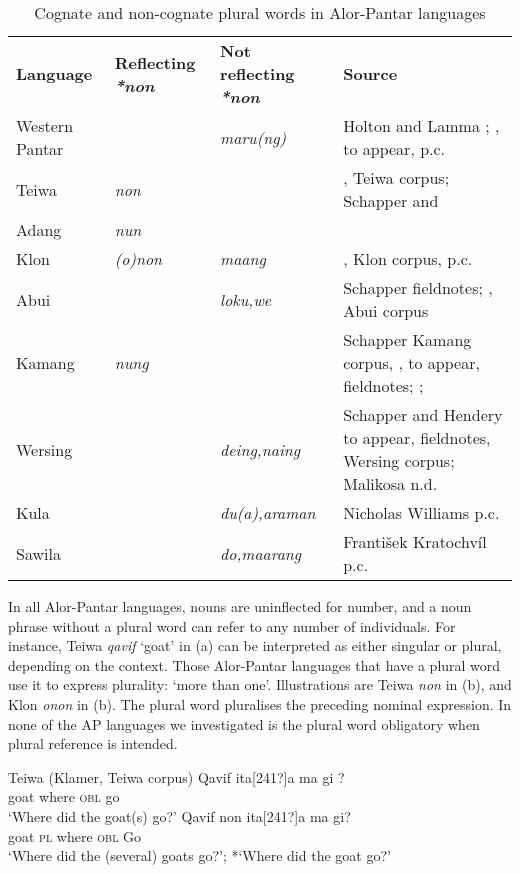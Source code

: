 \begin{table}\centering
\begin{tabular}{p{1.5cm}p{2cm}p{2.5cm}p{4cm}}
\textbf{Language}  &\textbf{Reflecting} \textbf{\textit{*non}} &\textbf{Not reflecting} \textbf{\textit{*non} } &\textbf{Source}\\
Western Pantar & &\textit{maru(ng)} &Holton and Lamma \citet{Koly2008}; \citet{Holton2012}, to appear, p.c.\\
Teiwa &\textit{non} & &\citet{Klamer2010}, Teiwa corpus; Schapper and \citet{Klamer2011}\\
Adang &\textit{nun} & &\citet{RobinsonEtAlToAppear}\\
Klon &\textit{(o)non} &\textit{maang} &\citet{Baird2008}, Klon corpus, p.c.\\
Abui & &\textit{loku,}\textit{we} &Schapper fieldnotes; \citet{Kratochvil2007}, Abui corpus\\
Kamang &\textit{nung} & &Schapper Kamang corpus, , to appear, fieldnotes;  \citet{SchapperEtAl2011};  \citet{Stokhof1978,Stokhof2982}\\
Wersing & &\textit{deing,}\textit{naing} &Schapper and Hendery to appear, fieldnotes,  Wersing corpus; Malikosa n.d.\\
Kula & &\textit{du(a),}\textit{araman} &Nicholas Williams p.c.\\
Sawila & &\textit{do,}\textit{maarang} &Franti\v{s}ek Kratochv\'il p.c.\\
\end{tabular}
\caption{Cognate and non-cognate plural words in Alor-Pantar languages}
\end{table}

In all Alor-Pantar languages, nouns are uninflected for number, and a noun phrase without a plural word can refer to any number of individuals. For instance, Teiwa \textit{qavif} `goat' in (a) can be interpreted as either singular or plural, depending on the context. Those Alor-Pantar languages that have a plural word use it to express plurality: `more than one'. Illustrations are Teiwa \textit{non} in (b), and Klon \textit{onon} in (b). The plural word pluralises the preceding nominal expression. In none of the AP languages we investigated is the plural word obligatory when plural reference is intended.

Teiwa (Klamer, Teiwa corpus)
\ea
\label{bkm:Ref334184518}
\ea
\gll  Qavif ita{[241?]}{a} ma gi ? \\
 goat where \textsc{obl} go \\
\glt `Where did the goat(s) go?'
\ex
\gll Qavif non ita{[241?]}a  ma gi? \\
 goat \textsc{pl} where \textsc{obl} Go \\
\glt `Where did the (several) goats go?';  *`Where did the goat go?'
\z
\z

